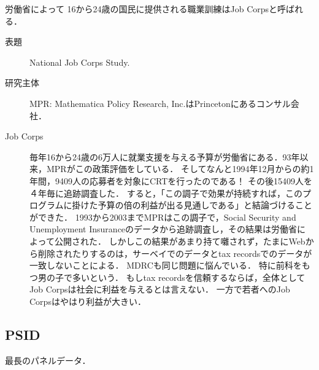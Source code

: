 \documentclass[uplatex,dvipdfmx]{jsreport}
\begin{document}
労働省によって
16から24歳の国民に提供される職業訓練はJob Corpsと呼ばれる．

\begin{description}
    \item[表題] National Job Corps Study.
    \item[研究主体] MPR: Mathematica Policy Research, Inc.はPrincetonにあるコンサル会社．
    \item[Job Corps] 毎年16から24歳の6万人に就業支援を与える予算が労働省にある．93年以来，MPRがこの政策評価をしている．
    そしてなんと1994年12月からの約1年間，9409人の応募者を対象にCRTを行ったのである！
    その後15409人を４年毎に追跡調査した．
    すると，「この調子で効果が持続すれば，このプログラムに掛けた予算の倍の利益が出る見通しである」と結論づけることができた．
    1993から2003までMPRはこの調子で，Social Security and Unemployment Insuranceのデータから追跡調査し，その結果\cite{JobCorps}は労働省によって公開された．
    しかしこの結果があまり持て囃されず，たまにWebから削除されたりするのは，サーベイでのデータとtax recordsでのデータが一致しないことによる．
    MDRCも同じ問題に悩んでいる．
    特に前科をもつ男の子で多いという．
    もしtax recordsを信頼するならば，全体としてJob Corpsは社会に利益を与えるとは言えない．
    一方で若者へのJob Corpsはやはり利益が大きい．
\end{description}


\subsection{PSID}

\begin{tcolorbox}[colframe=ForestGreen, colback=ForestGreen!10!white,breakable,colbacktitle=ForestGreen!40!white,coltitle=black,fonttitle=\bfseries\sffamily,
title=]
    最長のパネルデータ．
\end{tcolorbox}
\end{document}
